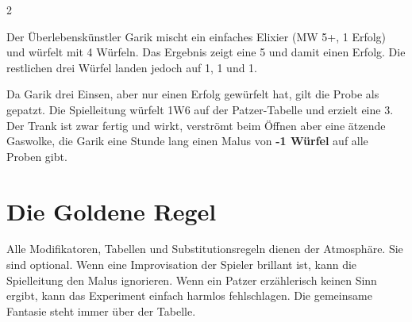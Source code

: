 \begin{multicols}{2}
\begin{pexample}[Beispiel]
Der Überlebenskünstler Garik mischt ein einfaches Elixier (MW 5+, 1 Erfolg) und würfelt mit 4 Würfeln. Das Ergebnis zeigt eine 5 und damit einen Erfolg. Die restlichen drei Würfel landen jedoch auf 1, 1 und 1.

Da Garik drei Einsen, aber nur einen Erfolg gewürfelt hat, gilt die Probe als gepatzt. Die Spielleitung würfelt 1W6 auf der Patzer-Tabelle und erzielt eine 3. Der Trank ist zwar fertig und wirkt, verströmt beim Öffnen aber eine ätzende Gaswolke, die Garik eine Stunde lang einen Malus von \textbf{-1 Würfel} auf alle Proben gibt.
\end{pexample}

\section{Die Goldene Regel}

Alle Modifikatoren, Tabellen und Substitutionsregeln dienen der Atmosphäre. Sie sind optional. Wenn eine Improvisation der Spieler brillant ist, kann die Spielleitung den Malus ignorieren. Wenn ein Patzer erzählerisch keinen Sinn ergibt, kann das Experiment einfach harmlos fehlschlagen. Die gemeinsame Fantasie steht immer über der Tabelle.

\end{multicols}
